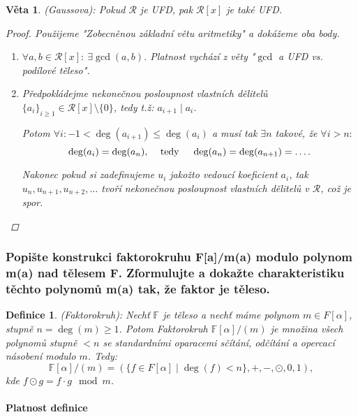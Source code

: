 \documentclass[10pt,a4paper]{article}
\newtheorem{veta}{Věta}
\newtheorem{definice}{Definice}
\newcommand{\F}{{\mathbb{F}}}       %
\newcommand{\RR}{{\mathcal{R}}}     %
\begin{document}
\begin{veta}(Gaussova): \normalfont 
    Pokud $\RR$ je UFD, pak $\RR[x]$ je také UFD.
    \begin{proof} Použijeme \textit{"Zobecněnou základní větu aritmetiky"} a dokážeme oba body.
        \begin{enumerate}[label=(\arabic*)]
            \item $\forall a,b \in \RR[x]: ~\exists \gcd(a,b)$. Platnost vychází z věty \textit{"$\gcd$ a UFD vs. podílové těleso"}.
            \item Předpokládejme nekonečnou posloupnost vlastních dělitelů $\{a_i\}_{i\geq 1} \in \RR[x]\setminus \{0\}$, tedy t.ž: $a_{i+1} \mid a_i$.
            
            Potom $\forall i: -1 < \deg(a_{i+1}) \leq \deg(a_i)$ a musí tak $\exists n$ takové, že $\forall i>n:$
            $$\deg(a_i) = \deg(a_n)\text{, \quad tedy \quad } \deg(a_n)=\deg(a_{n+1})=\dots.$$

            Nakonec pokud si zadefinujeme $u_{i}$ jakožto vedoucí koeficient $a_i$, tak $u_n, u_{n+1}, u_{n+2}, \dots$ tvoří nekonečnou posloupnost vlastních dělitelů v $\RR$, což je spor.
        \end{enumerate}
        
    \end{proof}
\end{veta}


\subsubsection{Popište konstrukci faktorokruhu F[a]/m(a) modulo polynom m(a) nad tělesem F. Zformulujte a dokažte charakteristiku těchto polynomů m(a) tak, že faktor je těleso.}

\begin{definice}(Faktorokruh): \normalfont 
    Nechť $\F$ je těleso a nechť máme polynom $m \in F[\alpha]$, stupně $n=\deg(m)\geq 1$.
    Potom \textit{Faktorokruh} $\F[\alpha]/(m)$ je množina všech polynomů stupně $<n$ se standardními oparacemi sčítání, odčítání a opercací násobení modulo $m$. Tedy:
    \[
        \F[\alpha]/(m) = (\{f \in F[\alpha] \mid \deg (f) < n\}, +, -, \odot, 0,1),
    \] kde $f\odot g = f\cdot g \mod m$.\ 
\end{definice}

\paragraph*{Platnost definice} \normalfont
\end{document}
